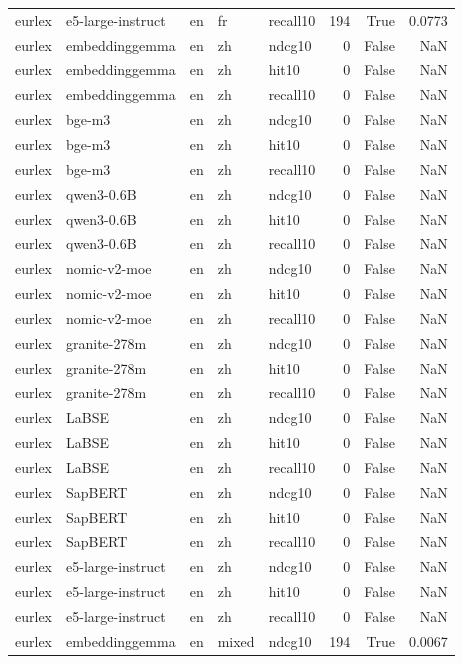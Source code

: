 \begin{tabular}{lllllrrr}
eurlex & e5-large-instruct & en & fr & recall10 & 194 & True & 0.0773 \\
eurlex & embeddinggemma & en & zh & ndcg10 & 0 & False & NaN \\
eurlex & embeddinggemma & en & zh & hit10 & 0 & False & NaN \\
eurlex & embeddinggemma & en & zh & recall10 & 0 & False & NaN \\
eurlex & bge-m3 & en & zh & ndcg10 & 0 & False & NaN \\
eurlex & bge-m3 & en & zh & hit10 & 0 & False & NaN \\
eurlex & bge-m3 & en & zh & recall10 & 0 & False & NaN \\
eurlex & qwen3-0.6B & en & zh & ndcg10 & 0 & False & NaN \\
eurlex & qwen3-0.6B & en & zh & hit10 & 0 & False & NaN \\
eurlex & qwen3-0.6B & en & zh & recall10 & 0 & False & NaN \\
eurlex & nomic-v2-moe & en & zh & ndcg10 & 0 & False & NaN \\
eurlex & nomic-v2-moe & en & zh & hit10 & 0 & False & NaN \\
eurlex & nomic-v2-moe & en & zh & recall10 & 0 & False & NaN \\
eurlex & granite-278m & en & zh & ndcg10 & 0 & False & NaN \\
eurlex & granite-278m & en & zh & hit10 & 0 & False & NaN \\
eurlex & granite-278m & en & zh & recall10 & 0 & False & NaN \\
eurlex & LaBSE & en & zh & ndcg10 & 0 & False & NaN \\
eurlex & LaBSE & en & zh & hit10 & 0 & False & NaN \\
eurlex & LaBSE & en & zh & recall10 & 0 & False & NaN \\
eurlex & SapBERT & en & zh & ndcg10 & 0 & False & NaN \\
eurlex & SapBERT & en & zh & hit10 & 0 & False & NaN \\
eurlex & SapBERT & en & zh & recall10 & 0 & False & NaN \\
eurlex & e5-large-instruct & en & zh & ndcg10 & 0 & False & NaN \\
eurlex & e5-large-instruct & en & zh & hit10 & 0 & False & NaN \\
eurlex & e5-large-instruct & en & zh & recall10 & 0 & False & NaN \\
eurlex & embeddinggemma & en & mixed & ndcg10 & 194 & True & 0.0067 \\

\end{tabular}
